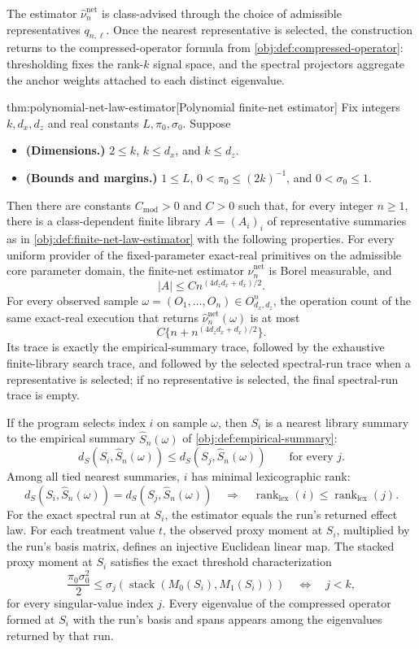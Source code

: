 The estimator \(\widehat\nu_n^{\mathrm{net}}\) is class-advised through the choice of admissible representatives \(q_{n,\ell}\). Once the nearest representative is selected, the construction returns to the compressed-operator formula from \cref{obj:def:compressed-operator}: thresholding fixes the rank-\(k\) signal space, and the spectral projectors aggregate the anchor weights attached to each distinct eigenvalue.

\begin{theoremv}{thm:polynomial-net-law-estimator}[Polynomial finite-net estimator]
Fix integers \(k,d_x,d_z\) and real constants \(L,\pi_0,\sigma_0\). Suppose
\begin{itemize}
\item \textbf{(Dimensions.)} \(2\le k\), \(k\le d_x\), and \(k\le d_z\).
\item \textbf{(Bounds and margins.)} \(1\le L\), \(0<\pi_0\le (2k)^{-1}\), and \(0<\sigma_0\le 1\).
\end{itemize}
Then there are constants \(C_{\mathrm{mod}}>0\) and \(C>0\) such that, for every integer \(n\ge 1\), there is a class-dependent finite library \(A=(A_i)_i\) of representative summaries as in \cref{obj:def:finite-net-law-estimator} with the following properties. For every uniform provider of the fixed-parameter exact-real primitives on the admissible core parameter domain, the finite-net estimator \(\widehat\nu_n^{\mathrm{net}}\) is Borel measurable, and
\[
|A|\le C n^{(4d_zd_x+d_x)/2}.
\]
For every observed sample \(\omega=(O_1,\ldots,O_n)\in O_{d_x,d_z}^n\), the operation count of the same exact-real execution that returns \(\widehat\nu_n^{\mathrm{net}}(\omega)\) is at most
\[
C\{n+n^{(4d_zd_x+d_x)/2}\}.
\]
Its trace is exactly the empirical-summary trace, followed by the exhaustive finite-library search trace, and followed by the selected spectral-run trace when a representative is selected; if no representative is selected, the final spectral-run trace is empty.

If the program selects index \(i\) on sample \(\omega\), then \(S_i\) is a nearest library summary to the empirical summary \(\widehat S_n(\omega)\) of \cref{obj:def:empirical-summary}:
\[
d_S(S_i,\widehat S_n(\omega))\le d_S(S_j,\widehat S_n(\omega))
\qquad\text{for every }j.
\]
Among all tied nearest summaries, \(i\) has minimal lexicographic rank:
\[
d_S(S_i,\widehat S_n(\omega))=d_S(S_j,\widehat S_n(\omega))
\quad\Longrightarrow\quad
\operatorname{rank}_{\mathrm{lex}}(i)\le \operatorname{rank}_{\mathrm{lex}}(j).
\]
For the exact spectral run at \(S_i\), the estimator equals the run's returned effect law. For each treatment value \(t\), the observed proxy moment at \(S_i\), multiplied by the run's basis matrix, defines an injective Euclidean linear map. The stacked proxy moment at \(S_i\) satisfies the exact threshold characterization
\[
\frac{\pi_0\sigma_0^2}{2}\le \sigma_j(\operatorname{stack}(M_0(S_i),M_1(S_i)))
\quad\Longleftrightarrow\quad
j<k,
\]
for every singular-value index \(j\). Every eigenvalue of the compressed operator formed at \(S_i\) with the run's basis and spans appears among the eigenvalues returned by that run.


\end{theoremv}
